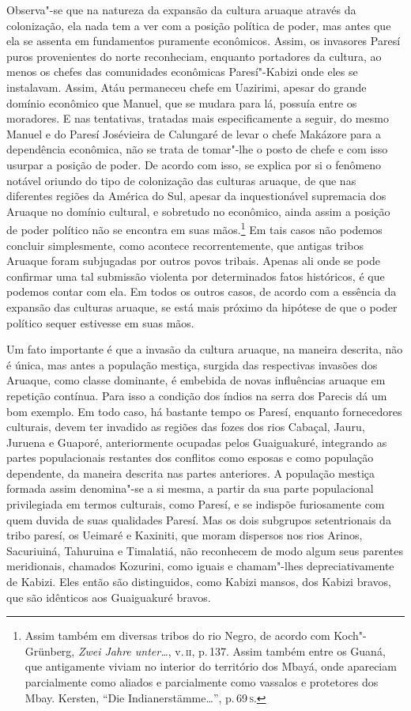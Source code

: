 Observa"-se que na natureza da expansão da cultura aruaque através da
colonização, ela nada tem a ver com a posição política de poder, mas
antes que ela se assenta em fundamentos puramente econômicos. Assim, os
invasores Paresí puros provenientes do norte reconheciam, enquanto
portadores da cultura, ao menos os chefes das comunidades econômicas
Paresí"-Kabizi onde eles se instalavam. Assim, Atáu permaneceu chefe em
Uazirimi, apesar do grande domínio econômico que Manuel, que se mudara
para lá, possuía entre os moradores. E nas tentativas, tratadas mais
especificamente a seguir, do mesmo Manuel e do Paresí Josévieira de
Calungaré de levar o chefe Makázore para a dependência econômica, não se
trata de tomar"-lhe o posto de chefe e com isso usurpar a posição de
poder. De acordo com isso, se explica por si o fenômeno notável oriundo
do tipo de colonização das culturas aruaque, de que nas diferentes
regiões da América do Sul, apesar da inquestionável supremacia dos
Aruaque no domínio cultural, e sobretudo no econômico, ainda assim a
posição de poder político não se encontra em suas mãos.\footnote{Assim
  também em diversas tribos do rio Negro, de acordo com Koch"-Grünberg,
  \textit{Zwei Jahre unter\ldots}, v.\,\textsc{ii}, p.\,137. Assim também
  entre os Guaná, que antigamente viviam no interior do território dos
  Mbayá, onde apareciam parcialmente como aliados e parcialmente como
  vassalos e protetores dos Mbay. Kersten, ``Die Indianerstämme\ldots'', p.\,69\,\textsc{s}.} Em
tais casos não podemos concluir simplesmente, como acontece
recorrentemente, que antigas tribos Aruaque foram subjugadas por outros
povos tribais. Apenas ali onde se pode confirmar uma tal submissão
violenta por determinados fatos históricos, é que podemos contar com
ela. Em todos os outros casos, de acordo com a essência da expansão das
culturas aruaque, se está mais próximo da hipótese de que o poder
político sequer estivesse em suas mãos.

Um fato importante é que a invasão da cultura aruaque, na maneira
descrita, não é única, mas antes a população mestiça, surgida das
respectivas invasões dos Aruaque, como classe dominante, é embebida de
novas influências aruaque em repetição contínua. Para isso a condição
dos índios na serra dos Parecis dá um bom exemplo. Em todo caso, há
bastante tempo os Paresí, enquanto fornecedores culturais, devem ter
invadido as regiões das fozes dos rios Cabaçal, Jauru, Juruena e
Guaporé, anteriormente ocupadas pelos Guaiguakuré, integrando as partes
populacionais restantes dos conflitos como esposas e como população
dependente, da maneira descrita nas partes anteriores. A população
mestiça formada assim denomina"-se a si mesma, a partir da sua parte
populacional privilegiada em termos culturais, como Paresí, e se
indispõe furiosamente com quem duvida de suas qualidades Paresí. Mas os
dois subgrupos setentrionais da tribo paresí, os Ueimaré e Kaxiniti, que
moram dispersos nos rios Arinos, Sacuriuiná, Tahuruina e Timalatiá, não
reconhecem de modo algum seus parentes meridionais, chamados Kozurini,
como iguais e chamam"-lhes depreciativamente de Kabizi. Eles então são
distinguidos, como Kabizi mansos, dos Kabizi bravos, que são idênticos
aos Guaiguakuré bravos.

